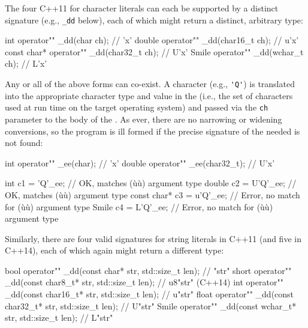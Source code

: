 The four C++11  for character literals can
each be supported by a distinct  signature (e.g.,
\lstinline!_dd! below), each of which might return a distinct, arbitrary
type:

\begin{emcppslisting}
int         operator"" _dd(char     ch);  //  'x'
double      operator"" _dd(char16_t ch);  // u'x'
const char* operator"" _dd(char32_t ch);  // U'x'
Smile       operator"" _dd(wchar_t  ch);  // L'x'
\end{emcppslisting}
    
\noindent Any or all of the above forms can co-exist. A character  (e.g., \lstinline!'Q'!) is translated into the appropriate
character type and value in the  (i.e.,
the set of characters used at run time on the target operating system)
and passed via the \lstinline!ch! parameter to the body of the . As ever, there are no narrowing or widening conversions, so
the program is ill formed if the precise signature of the needed
 is not found:

\begin{emcppslisting}
int    operator"" _ee(char);      //  'x'
double operator"" _ee(char32_t);  // U'x'

int         c1 =  'Q'_ee;  // OK, matches (ù{}ù) argument type
double      c2 = U'Q'_ee;  // OK, matches (ù{}ù) argument type
const char* c3 = u'Q'_ee;  // Error, no match for (ù{}ù) argument type
Smile       c4 = L'Q'_ee;  // Error, no match for (ù{}ù) argument type
\end{emcppslisting}
    
\noindent Similarly, there are four valid  signatures for
string literals in C++11 (and five in C++14), each of which again might
return a different type:

\begin{emcppslisting}
bool  operator"" _dd(const char*     str, std::size_t len);  //   "str"
short operator"" _dd(const char8_t*  str, std::size_t len);  // u8"str" (C++14)
int   operator"" _dd(const char16_t* str, std::size_t len);  //  u"str"
float operator"" _dd(const char32_t* str, std::size_t len);  //  U"str"
Smile operator"" _dd(const wchar_t*  str, std::size_t len);  //  L"str"
\end{emcppslisting}
    
